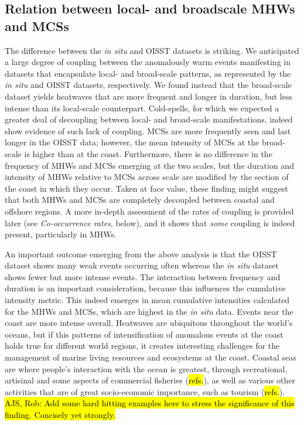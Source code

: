 \documentclass[a4paper,10pt,review]{elsarticle}
\begin{document}
\subsection{Relation between local- and broadscale MHWs and MCSs}
The difference between the \emph{in situ} and OISST datasets is striking. We anticipated a large degree of coupling between the anomalously warm events manifesting in datasets that encapsulate local- and broad-scale patterns, as represented by the \emph{in situ} and OISST datasets, respectively. We found instead that the broad-scale dataset yields heatwaves that are more frequent and longer in duration, but less intense than its local-scale counterpart. Cold-spells, for which we expected a greater deal of decoupling between local- and broad-scale manifestations, indeed show evidence of such lack of coupling. MCSs are more frequently seen and last longer in the OISST data; however, the mean intensity of MCSs at the broad-scale is higher than at the coast. Furthermore, there is no difference in the frequency of MHWs and MCSs emerging at the two scales, but the duration and intensity of MHWs relative to MCSs across scale are modified by the section of the coast in which they occur. Taken at face value, these finding might suggest that both MHWs and MCSs are completely decoupled between coastal and offshore regions. A more in-depth assessment of the rates of coupling is provided later (see \emph{Co-occurrence rates}, below), and it shows that \emph{some} coupling is indeed present, particularly in MHWs.

An important outcome emerging from the above analysis is that the OISST dataset shows many weak events occurring often whereas the \emph{in situ} dataset shows fewer but more intense events. The interaction between frequency and duration is an important consideration, because this influences the cumulative intensity metric. This indeed emerges in mean cumulative intensities calculated for the MHWs and MCSs, which are highest in the \emph{in situ} data. Events near the coast are more intense overall. Heatwaves are ubiquitous throughout the world's oceans, but if this patterns of intensification of anomalous events at the coast holds true for different world regions, it creates interesting challenges for the management of marine living resources and ecosystems at the coast. Coastal seas are where people's interaction with the ocean is greatest, through recreational, artisinal and some aspects of commercial fisheries (\hl{refs.}), as well as various other activities that are of great socio-economic importance, such as tourism (\hl{refs.}). \hl{AJS, Rob: Add some hard hitting examples here to stress the significance of this finding. Concisely yet strongly.}
\end{document}
